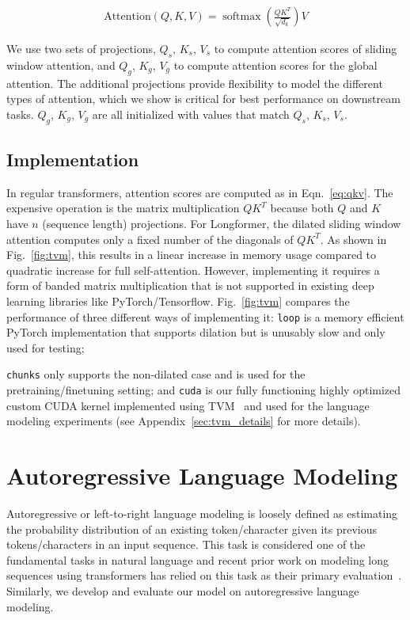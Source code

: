 \begin{align}
\label{eq:qkv}
\text {Attention}(Q, K, V)=\operatorname{softmax}\left(\frac{Q K^{T}}{\sqrt{d_{k}}}\right) V
\end{align}

We use two sets of projections, $Q_s$, $K_s$, $V_s$ to compute attention scores of sliding window attention, and  $Q_g$, $K_g$, $V_g$ to  compute attention scores for the global attention. The additional projections provide flexibility to model the different types of attention, which we show is critical for best performance on downstream tasks. $Q_g$, $K_g$, $V_g$ are all initialized with values that match $Q_s$, $K_s$, $V_s$. 

\subsection{Implementation}
\label{sec:tvm}

In regular transformers, attention scores are computed as in Eqn.~\ref{eq:qkv}. 
The expensive operation is the matrix multiplication $Q K^{T}$ because both $Q$ and $K$ have $n$ (sequence length) projections. For Longformer, the dilated sliding window attention computes only a fixed number of the diagonals of $Q K^{T}$. As shown in Fig.~\ref{fig:tvm}, this results in a linear increase in memory usage compared to quadratic increase for full self-attention. However, implementing it requires a form of banded matrix multiplication that is not supported in existing deep learning libraries like PyTorch/Tensorflow.
Fig.~\ref{fig:tvm} compares the performance of three different ways of implementing it:
\texttt{loop} is a memory efficient PyTorch implementation that supports dilation but is unusably slow and only used for testing;

\texttt{chunks} only supports the non-dilated case and is used for the pretraining/finetuning setting; and \texttt{cuda} is our fully functioning highly optimized custom CUDA kernel implemented using TVM~\cite{tvm} and used for the language modeling experiments (see  Appendix~\ref{sec:tvm_details} for more details).

\section{Autoregressive Language Modeling} Autoregressive or left-to-right language modeling is loosely defined as estimating the probability distribution of an existing token/character given its previous tokens/characters in an input sequence. This task is considered one of the fundamental tasks in natural language and recent prior work on modeling long sequences using transformers has relied on this task as their primary evaluation~\cite{transformerxl,compressive,adaptivespan}. Similarly, we develop and evaluate our model on autoregressive language modeling. 


